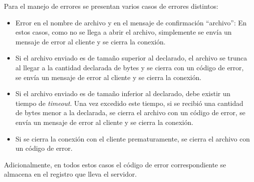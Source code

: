 Para el manejo de errores se presentan varios casos de errores distintos: 

\begin{itemize}
    \item Error en el nombre de archivo y en el mensaje de confirmación ``archivo'': En estos casos, como no se llega a abrir el archivo, simplemente se envía un mensaje de error al cliente y se cierra la conexión.
    \item Si el archivo enviado es de tamaño superior al declarado, el archivo se trunca al llegar a la cantidad declarada de bytes y se cierra con un código de error, se envía un mensaje de error al cliente y se cierra la conexión.
    \item Si el archivo enviado es de tamaño inferior al declarado, debe existir un tiempo de \textit{timeout}. Una vez excedido este tiempo, si se recibió una cantidad de bytes menor a la declarada, se cierra el archivo con un código de error, se envía un mensaje de error al cliente y se cierra la conexión.
    \item Si se cierra la conexión con el cliente prematuramente, se cierra el archivo con un código de error.
\end{itemize}

Adicionalmente, en todos estos casos el código de error correspondiente se almacena en el registro que lleva el servidor.\\